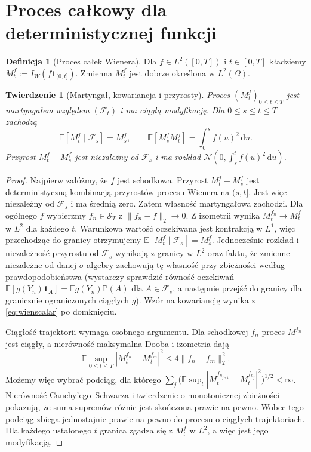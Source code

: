 \documentclass[11pt,a4paper,oneside]{report}
\numberwithin{equation}{chapter}
\theoremstyle{plain}
\newtheorem{twierdzenie}{Twierdzenie}[chapter]
\theoremstyle{definition}
\newtheorem{definicja}{Definicja}[chapter]
\theoremstyle{remark}
\newcommand{\Prob}{\mathbb{P}}
\newcommand{\E}{\mathbb{E}}
\newcommand{\calF}{\mathcal{F}}
\newcommand{\calS}{\mathcal{S}}
\newcommand{\ind}[1]{\mathbf{1}_{#1}}
\newcommand{\dd}{\mathrm{d}}
\newcommand{\norm}[1]{\lVert #1\rVert}
\newcommand{\Normal}{\mathcal{N}}
\begin{document}
\section{Proces całkowy dla deterministycznej funkcji}\label{sec:volIII:01:04}
\begin{definicja}[Proces całek Wienera]\label{def:volIII:01:03}
Dla $f\in L^2([0,T])$ i $t\in[0,T]$ kładziemy
$M_t^f:=I_W(f\ind{(0,t]})$.
Zmienna $M_t^f$ jest dobrze określona w $L^2(\Omega)$.
\end{definicja}
\begin{twierdzenie}[Martyngał, kowariancja i przyrosty]\label{thm:volIII:01:04}
Proces $(M_t^f)_{0\le t\le T}$ jest martyngałem względem
$(\calF_t)$ i ma ciągłą modyfikację. Dla $0\le s\le t\le T$
zachodzą
\[
\E[M_t^f\mid\calF_s]=M_s^f,\qquad
\E[M_s^fM_t^f]=\int_0^sf(u)^2\,\dd u.
\tag{1.5}
\]
Przyrost $M_t^f-M_s^f$ jest niezależny od $\calF_s$
i ma rozkład $\Normal(0,\int_s^tf(u)^2\,\dd u)$.
\end{twierdzenie}
\begin{proof}
Najpierw załóżmy, że $f$ jest schodkowa. Przyrost
$M_t^f-M_s^f$ jest deterministyczną kombinacją przyrostów
procesu Wienera na $(s,t]$. Jest więc niezależny od $\calF_s$
i ma średnią zero. Zatem własność martyngałowa zachodzi.
Dla ogólnego $f$ wybierzmy $f_n\in\calS_T$ z
$\norm{f_n-f}_2\to0$. Z izometrii wynika
$M_t^{f_n}\to M_t^f$ w $L^2$ dla każdego $t$.
Warunkowa wartość oczekiwana jest kontrakcją w $L^1$,
więc przechodząc do granicy otrzymujemy
$\E[M_t^f\mid\calF_s]=M_s^f$. Jednocześnie rozkład
i niezależność przyrostu od $\calF_s$ wynikają z granicy
w $L^2$ oraz faktu, że zmienne niezależne od danej
$\sigma$-algebry zachowują tę własność przy zbieżności
według prawdopodobieństwa (wystarczy sprawdzić równość
oczekiwań $\E[g(Y_n)\ind A]=\E g(Y_n)\Prob(A)$ dla
$A\in\calF_s$, a następnie przejść do granicy dla
granicznie ograniczonych ciągłych $g$). Wzór na kowariancję
wynika z \eqref{eq:wienscalar} po domknięciu.

Ciągłość trajektorii wymaga osobnego argumentu. Dla
schodkowej $f_n$ proces $M^{f_n}$ jest ciągły, a
nierówność maksymalna Dooba i izometria dają
\[
\E\sup_{0\le t\le T}|M_t^{f_n}-M_t^{f_m}|^2
\le4\norm{f_n-f_m}_2^2.
\]
Możemy więc wybrać podciąg, dla którego
$\sum_j\big(\E\sup_t|M_t^{f_{n_{j+1}}}-M_t^{f_{n_j}}|^2\big)^{1/2}<\infty$.
Nierówność Cauchy'ego--Schwarza i twierdzenie o monotonicznej
zbieżności pokazują, że suma supremów różnic jest skończona
prawie na pewno. Wobec tego podciąg zbiega jednostajnie
prawie na pewno do procesu o ciągłych trajektoriach.
Dla każdego ustalonego $t$ granica zgadza się z $M_t^f$
w $L^2$, a więc jest jego modyfikacją.
\end{proof}
\end{document}
